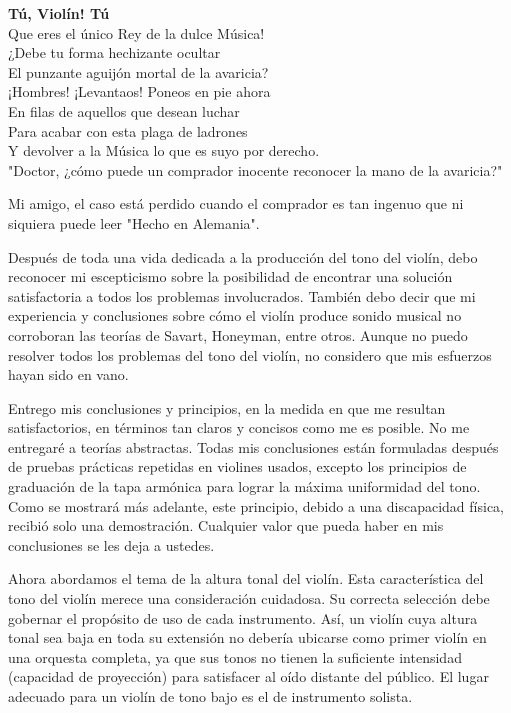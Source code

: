 \documentclass[12pt]{book}
\begin{document}
\textbf{Tú, Violín! Tú}\\
Que eres el único Rey de la dulce Música!\\
¿Debe tu forma hechizante ocultar\\
El punzante aguijón mortal de la avaricia?\\
¡Hombres! ¡Levantaos! Poneos en pie ahora\\
En filas de aquellos que desean luchar\\
Para acabar con esta plaga de ladrones\\
Y devolver a la Música lo que es suyo por derecho.\\

"Doctor, ¿cómo puede un comprador inocente reconocer la mano de la avaricia?"\newline

Mi amigo, el caso está perdido cuando el comprador es tan ingenuo que ni siquiera puede leer "Hecho en Alemania".\newline

Después de toda una vida dedicada a la producción del tono del violín, debo reconocer mi escepticismo sobre la posibilidad de encontrar una solución satisfactoria a todos los problemas involucrados. También debo decir que mi experiencia y conclusiones sobre cómo el violín produce sonido musical no corroboran las teorías de Savart, Honeyman, entre otros. Aunque no puedo resolver todos los problemas del tono del violín, no considero que mis esfuerzos hayan sido en vano.\newline

Entrego mis conclusiones y principios, en la medida en que me resultan satisfactorios, en términos tan claros y concisos como me es posible. No me entregaré a teorías abstractas. Todas mis conclusiones están formuladas después de pruebas prácticas repetidas en violines usados, excepto los principios de graduación de la tapa armónica para lograr la máxima uniformidad del tono. Como se mostrará más adelante, este principio, debido a una discapacidad física, recibió solo una demostración. Cualquier valor que pueda haber en mis conclusiones se les deja a ustedes.\newline

Ahora abordamos el tema de la altura tonal del violín. Esta característica del tono del violín merece una consideración cuidadosa. Su correcta selección debe gobernar el propósito de uso de cada instrumento. Así, un violín cuya altura tonal sea baja en toda su extensión no debería ubicarse como primer violín en una orquesta completa, ya que sus tonos no tienen la suficiente intensidad (capacidad de proyección) para satisfacer al oído distante del público. El lugar adecuado para un violín de tono bajo es el de instrumento solista.
\end{document}
